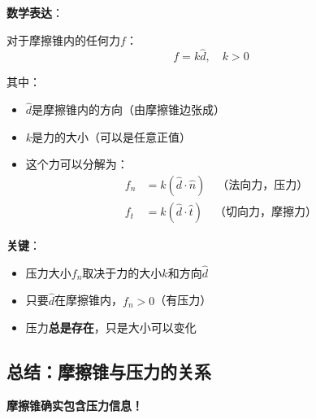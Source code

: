 \documentclass[12pt,a4paper]{article}
\begin{document}
\textbf{数学表达}：

对于摩擦锥内的任何力$f$：
\begin{equation}
f = k \hat{d}, \quad k > 0
\end{equation}

其中：
\begin{itemize}
\item $\hat{d}$是摩擦锥内的方向（由摩擦锥边张成）
\item $k$是力的大小（可以是任意正值）
\item 这个力可以分解为：
   \begin{align}
   f_n &= k (\hat{d} \cdot \hat{n}) \quad \text{（法向力，压力）} \\
   f_t &= k (\hat{d} \cdot \hat{t}) \quad \text{（切向力，摩擦力）}
   \end{align}
\end{itemize}

\textbf{关键}：
\begin{itemize}
\item 压力大小$f_n$取决于力的大小$k$和方向$\hat{d}$
\item 只要$\hat{d}$在摩擦锥内，$f_n > 0$（有压力）
\item 压力\textbf{总是存在}，只是大小可以变化
\end{itemize}

\subsection{总结：摩擦锥与压力的关系}

\textbf{摩擦锥确实包含压力信息！}
\end{document}
